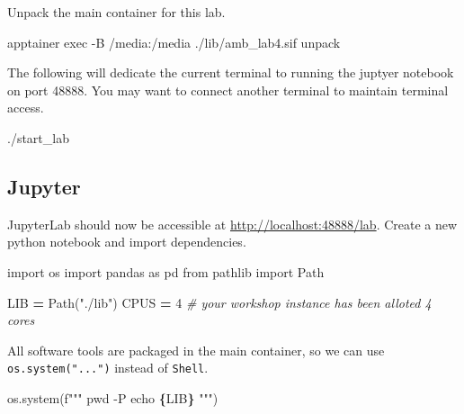 \documentclass[
]{book}
\newenvironment{Shaded}{\begin{snugshade}}{\end{snugshade}}
\newcommand{\AttributeTok}[1]{\textcolor[rgb]{0.13,0.29,0.53}{#1}}
\newcommand{\CommentTok}[1]{\textcolor[rgb]{0.56,0.35,0.01}{\textit{#1}}}
\newcommand{\DecValTok}[1]{\textcolor[rgb]{0.00,0.00,0.81}{#1}}
\newcommand{\ExtensionTok}[1]{#1}
\newcommand{\ImportTok}[1]{#1}
\newcommand{\NormalTok}[1]{#1}
\newcommand{\OperatorTok}[1]{\textcolor[rgb]{0.81,0.36,0.00}{\textbf{#1}}}
\newcommand{\SpecialCharTok}[1]{\textcolor[rgb]{0.81,0.36,0.00}{\textbf{#1}}}
\newcommand{\SpecialStringTok}[1]{\textcolor[rgb]{0.31,0.60,0.02}{#1}}
\newcommand{\StringTok}[1]{\textcolor[rgb]{0.31,0.60,0.02}{#1}}
\begin{document}
Unpack the main container for this lab.

\begin{Shaded}
\begin{Highlighting}[]
\ExtensionTok{apptainer}\NormalTok{ exec }\AttributeTok{{-}B}\NormalTok{ /media:/media ./lib/amb\_lab4.sif unpack}
\end{Highlighting}
\end{Shaded}

The following will dedicate the current terminal to running the juptyer notebook on port 48888.
You may want to connect another terminal to maintain terminal access.

\begin{Shaded}
\begin{Highlighting}[]
\ExtensionTok{./start\_lab}
\end{Highlighting}
\end{Shaded}

\subsection{Jupyter}\label{jupyter-1}

JupyterLab should now be accessible at \url{http://localhost:48888/lab}. Create a new python notebook and import dependencies.

\begin{Shaded}
\begin{Highlighting}[numbers=left,,]
\ImportTok{import}\NormalTok{ os}
\ImportTok{import}\NormalTok{ pandas }\ImportTok{as}\NormalTok{ pd}
\ImportTok{from}\NormalTok{ pathlib }\ImportTok{import}\NormalTok{ Path}

\NormalTok{LIB }\OperatorTok{=}\NormalTok{ Path(}\StringTok{"./lib"}\NormalTok{)}
\NormalTok{CPUS }\OperatorTok{=} \DecValTok{4} \CommentTok{\# your workshop instance has been alloted 4 cores}
\end{Highlighting}
\end{Shaded}

All software tools are packaged in the main container, so we can use \texttt{os.system("...")} instead of \texttt{Shell}.

\begin{Shaded}
\begin{Highlighting}[numbers=left,,]
\NormalTok{os.system(}\SpecialStringTok{f"""}
\SpecialStringTok{pwd {-}P}
\SpecialStringTok{echo }\SpecialCharTok{\{}\NormalTok{LIB}\SpecialCharTok{\}}
\SpecialStringTok{"""}\NormalTok{)}
\end{Highlighting}
\end{Shaded}
\end{document}
